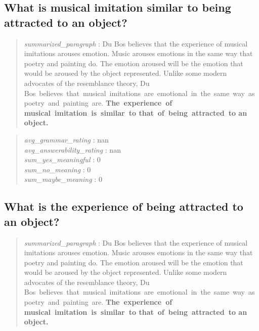 \hypertarget{what-is-musical-imitation-similar-to-being-attracted-to-an-object}{%
\subsection{What is musical imitation similar to being attracted to an
object?}\label{what-is-musical-imitation-similar-to-being-attracted-to-an-object}}

\begin{quote}
\emph{summarized\_paragraph} : Du Bos believes that the experience of
musical imitations arouses emotion. Music arouses emotions in the same
way that poetry and painting do. The emotion aroused will be the emotion
that would be aroused by the object represented. Unlike some modern
advocates of the resemblance theory, Du
Bos~believes~that~musical~imitations~are~emotional~in~the~same~way~as~poetry~and~painting~are.
\textbf{The~experience~of musical~imitation~is~similar~to
that~of~being~attracted~to an object.}
\end{quote}

\begin{quote}
\emph{avg\_grammar\_rating} : nan\\
\emph{avg\_answerability\_rating} : nan\\
\emph{sum\_yes\_meaningful} : 0\\
\emph{sum\_no\_meaning} : 0\\
\emph{sum\_maybe\_meaning} : 0
\end{quote}

\hypertarget{what-is-the-experience-of-being-attracted-to-an-object}{%
\subsection{What is the experience of being attracted to an
object?}\label{what-is-the-experience-of-being-attracted-to-an-object}}

\begin{quote}
\emph{summarized\_paragraph} : Du Bos believes that the experience of
musical imitations arouses emotion. Music arouses emotions in the same
way that poetry and painting do. The emotion aroused will be the emotion
that would be aroused by the object represented. Unlike some modern
advocates of the resemblance theory, Du
Bos~believes~that~musical~imitations~are~emotional~in~the~same~way~as~poetry~and~painting~are.
\textbf{The~experience~of musical~imitation~is~similar~to
that~of~being~attracted~to an object.}
\end{quote}

